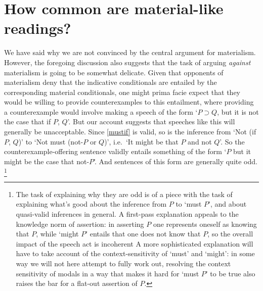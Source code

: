 \documentclass[If.tex]{subfiles}
\begin{document}
\section{How common are material-like readings?}
\label{sect:antimaterial}
We have said why we are not convinced by the central argument for materialism.  However, the foregoing discussion also suggests that the task of arguing \emph{against} materialism is going to be somewhat delicate.  Given that opponents of materialism deny that the indicative conditionals are entailed by the corresponding material conditionals, one might prima facie expect that they would be willing to provide counterexamples to this entailment, where providing a counterexample would involve making a speech of the form ‘$P ⊃ Q$, but it is not the case that if $P$, $Q$’.  But our account suggests that speeches like this will generally be unacceptable.  Since \ref{mustif} is valid, so is the inference from ‘Not (if $P$, $Q$)’ to ‘Not must (not-$P$ or $Q$)’, i.e.\ ‘It might be that $P$ and not $Q$’.  So the counterexample-offering sentence validly entails something of the form ‘$P$ but it might be the case that not-$P$’.  And sentences of this form are generally quite odd.%
\footnote{The task of explaining why they are odd is of a piece with the task of explaining what's good about the inference from $P$ to ‘must $P$’, and about quasi-valid inferences in general.  A first-pass explanation appeals to the knowledge norm of assertion: in asserting $P$ one represents oneself as knowing that $P$, while ‘might $P$’ entails that one does not know that $P$, so the overall impact of the speech act is incoherent  A more sophisticated explanation will have to take account of the context-sensitivity of ‘must’ and ‘might’: in some way we will not here attempt to fully work out, resolving the context sensitivity of modals in a way that makes it hard for ‘must $P$’ to be true also raises the bar for a flat-out assertion of $P$.}
\end{document}

